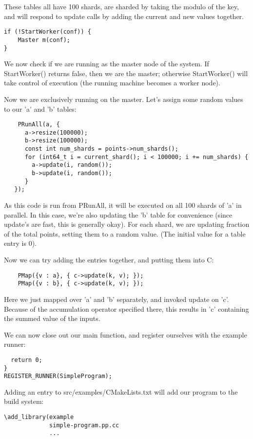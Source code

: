 \documentclass[10pt]{article}
\begin{document}
These tables all have 100 shards, are sharded by taking the modulo of the key,
and will respond to update calls by adding the current and new values together.

\begin{lstlisting}
if (!StartWorker(conf)) {
    Master m(conf);
}   
\end{lstlisting}

We now check if we are running as the master node of the system.  If
StartWorker() returns false, then we are the master; otherwise StartWorker()
will take control of execution (the running machine becomes a worker node).

Now we are exclusively running on the master.  Let's assign some random values
to our 'a' and 'b' tables:
\begin{lstlisting}
    PRunAll(a, {
      a->resize(100000);
      b->resize(100000);
      const int num_shards = points->num_shards();
      for (int64_t i = current_shard(); i < 100000; i += num_shards) {
        a->update(i, random());
        b->update(i, random()); 
      }      
   });
\end{lstlisting}

As this code is run from PRunAll, it will be executed on all 100 shards of 'a'
in parallel.  In this case, we're also updating the 'b' table for convenience
(since update's are fast, this is generally okay).  For each shard, we are
updating fraction of the total points, setting them to a random value.  (The
initial value for a table entry is 0).

Now we can try adding the entries together, and putting them into C:
\begin{lstlisting}
    PMap({v : a}, { c->update(k, v); });
    PMap({v : b}, { c->update(k, v); });
\end{lstlisting}

Here we just mapped over 'a' and 'b' separately, and invoked update on 'c'. 
Because of the accumulation operator specified there, this results in 'c'
containing the summed value of the inputs.

We can now close out our main function, and register ourselves with the example
runner:

\begin{lstlisting}
  return 0;
}
REGISTER_RUNNER(SimpleProgram);
\end{lstlisting}

Adding an entry to src/examples/CMakeLists.txt will add our program to the build
system:
\begin{lstlisting}
\add_library(example 
             simple-program.pp.cc
             ...
\end{lstlisting}
\end{document}
